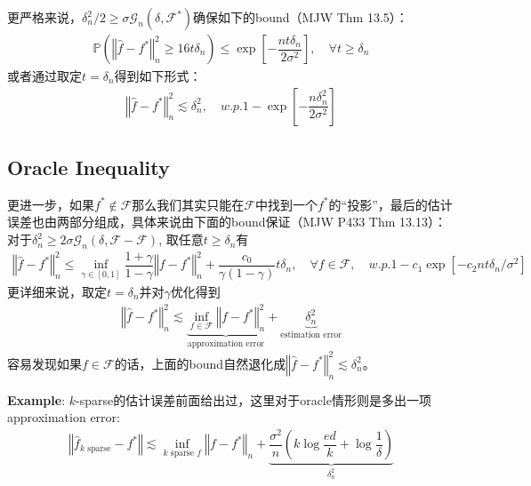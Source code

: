 \documentclass[11pt,a4paper]{ctexart}
\numberwithin{equation}{section}%
\begin{document}
更严格来说，$ \delta_n^2/2 \geq \sigma \mathcal{G}_n(\delta ,\mathscr{F}^*) $确保如下的bound（MJW Thm 13.5）：
\begin{align*}
    \mathbb{P}\left( \left\Vert \hat{f}-f^* \right\Vert _n^2 \geq 16t\delta _n  \right) \leq \exp\left[ -\dfrac{ nt\delta _n  }{ 2\sigma ^2 }  \right],\quad \forall t\geq \delta _n 
\end{align*}
或者通过取定$ t=\delta _n $得到如下形式：
\begin{align*}
    \left\Vert \hat{f }-f^*  \right\Vert _n^2 \lesssim \delta_n^2 ,\quad w.p. 1-\exp\left[ -\dfrac{ n\delta _n^2 }{ 2\sigma ^2 }  \right]
\end{align*}





\subsection{Oracle Inequality}
更进一步，如果$ f^*\not\in \mathscr{ F } $那么我们其实只能在$ \mathscr{F} $中找到一个$ f^* $的“投影”，最后的估计误差也由两部分组成，具体来说由下面的bound保证（MJW P433 Thm 13.13）：对于$ \delta _n^2\geq 2\sigma \mathcal{G}_n(\delta , \mathscr{F}-\mathscr{F}) $, 取任意$ t\geq \delta _n $有
\begin{align*}
    \left\Vert \hat{f } - f^* \right\Vert _n^2\leq \mathop{ \inf  }\limits_{\gamma \in [0,1]} \dfrac{ 1+\gamma  }{ 1-\gamma  } \left\Vert f-f^* \right\Vert _n^2 + \dfrac{ c_0 }{ \gamma (1-\gamma ) } t\delta _n ,\quad \forall f\in \mathscr{F},\quad w.p. 1-c_1\exp\left[ -c_2nt\delta _n /\sigma ^2 \right]
\end{align*}
更详细来说，取定$ t=\delta _n $并对$ \gamma  $优化得到
\begin{align*}
    \left\Vert \hat{f } - f^* \right\Vert _n^2 \lesssim \underbrace{\mathop{ \inf  }\limits_{f\in \mathscr{F}} \left\Vert f-f^* \right\Vert _n^2 }_{\text{approximation error}} + \underbrace{\delta _n^2 }_{\text{estimation error}}
\end{align*}
容易发现如果$ f\in \mathscr{F} $的话，上面的bound自然退化成$ \left\Vert \hat{f } - f^* \right\Vert _n^2 \lesssim \delta _n^2 $。

\textbf{Example}: $ k $-sparse的估计误差前面给出过，这里对于oracle情形则是多出一项approximation error:
\begin{align*}
    \left\Vert \hat{f}_{k\text{ sparse}}-f^* \right\Vert \lesssim \mathop{ \inf  }\limits_{ k\text{ sparse } f} \left\Vert f-f^* \right\Vert _n + \underbrace{ \dfrac{ \sigma ^2 }{ n } \left( k\log\dfrac{ ed }{ k } + \log \dfrac{ 1 }{ \delta  }   \right) }_{\delta _n^2}
\end{align*}
\end{document}
